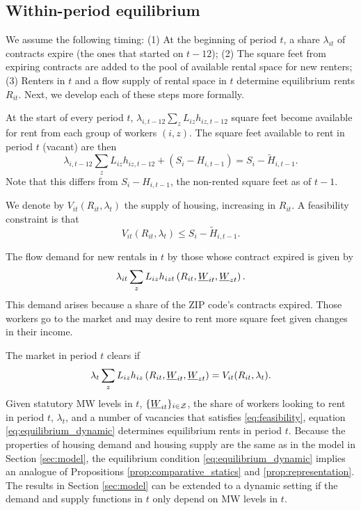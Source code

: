 \subsection*{Within-period equilibrium}

We assume the following timing: 
(1) At the beginning of period $t$, a share $\lambda_{it}$ of contracts 
expire (the ones that started on $t-12$);
(2) The square feet from expiring contracts are added to the pool of available 
rental space for new renters;
(3) Renters in $t$ and a flow supply of rental space in $t$ determine equilibrium 
rents $R_{it}$.
Next, we develop each of these steps more formally.

At the start of every period $t$, $\lambda_{i,t-12} \sum_z L_{iz} h_{iz,t-12}$ 
square feet become available for rent from each group of workers $(i,z)$.
The square feet available to rent in period $t$ (vacant) are then
$$
\lambda_{i,t-12} \sum_z L_{iz} h_{iz,t-12} + (S_i - H_{i,t-1}) 
       = S_i - \tilde H_{i,t-1}.
$$
Note that this differs from $S_i - H_{i,t-1}$, the non-rented square feet as 
of $t-1$.

We denote by $V_{it}(R_{it}, \lambda_t)$ the supply of housing, increasing in 
$R_{it}$.
A feasibility constraint is that 
\begin{equation}\label{eq:feasibility}
    V_{it}(R_{it}, \lambda_t) \leq S_i - \tilde H_{i,t-1} .
\end{equation}

The flow demand for new rentals in $t$ by those whose contract expired is given 
by
$$
\lambda_{it} \sum_z L_{iz} h_{izt} \left(R_{it}, \underline{W}_{it}, \underline{W}_{zt} \right) .
$$
This demand arises because a share of the ZIP code's contracts expired. 
Those workers go to the market and may desire to rent more square feet given 
changes in their income.

The market in period $t$ clears if
\begin{equation}\label{eq:equilibrium_dynamic}
    \lambda_t \sum_z L_{iz} h_{iz} \left(R_{it}, \underline{W}_{it}, \underline{W}_{zt} \right) = 
    V_{it}(R_{it}, \lambda_t) .
\end{equation}
Given statutory MW levels in $t$, $\{\underline{W}_{it}\}_{i\in\mathcal{Z}}$,
the share of workers looking to rent in period $t$, $\lambda_t$, and 
a number of vacancies that satisfies \eqref{eq:feasibility}, 
equation \eqref{eq:equilibrium_dynamic} determines equilibrium rents in 
period $t$.
Because the properties of housing demand and housing supply are the same as in 
the model in Section \ref{sec:model},
the equilibrium condition \eqref{eq:equilibrium_dynamic} implies an analogue of 
Propositions \ref{prop:comparative_statics} and \ref{prop:representation}.
The results in Section \ref{sec:model} can be extended to a dynamic setting if
the demand and supply functions in $t$ only depend on MW levels in $t$.

